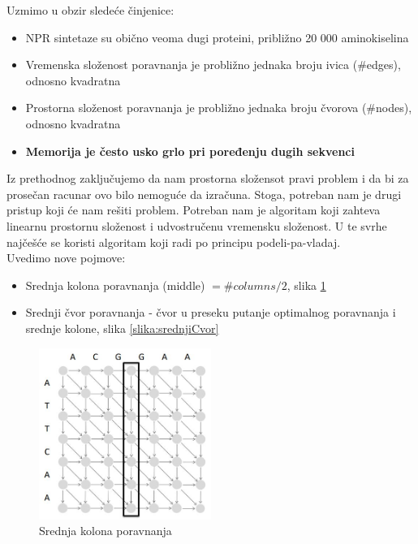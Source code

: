 Uzmimo u obzir sledeće činjenice:
\begin{itemize}
    \item NPR sintetaze su obično veoma dugi proteini, približno 20 000 aminokiselina
    \item Vremenska složenost poravnanja je probližno jednaka broju ivica (\#edges), odnosno kvadratna
    \item Prostorna složenost poravnanja je probližno jednaka broju čvorova (\#nodes), odnosno kvadratna
    \item \textbf{Memorija je često usko grlo pri poređenju dugih sekvenci}
\end{itemize}

Iz prethodnog zaključujemo da nam prostorna složensot pravi problem i da bi za prosečan racunar ovo bilo nemoguće da izračuna. 
Stoga, potreban nam je drugi pristup koji će nam rešiti problem. Potreban nam je algoritam koji zahteva linearnu prostornu složenost i udvostručenu vremensku složenost. U te svrhe najčešće se koristi algoritam koji radi po principu podeli-pa-vladaj. \\

Uvedimo nove pojmove:
\begin{itemize}
    \item Srednja kolona poravnanja (middle) $= \#columns/2$, slika \ref{slika:srednjaKolona}
    \item Srednji čvor poravnanja - čvor u preseku putanje optimalnog poravnanja i srednje kolone, slika \ref{slika:srednjiCvor}
\end{itemize}


\begin{figure}[h!]
\centering
\includegraphics[width=0.5\textwidth]{poglavlja/5/slike/srednjaKolona.JPG}
\caption{Srednja kolona poravnanja}
\label{slika:srednjaKolona}
\end{figure}

